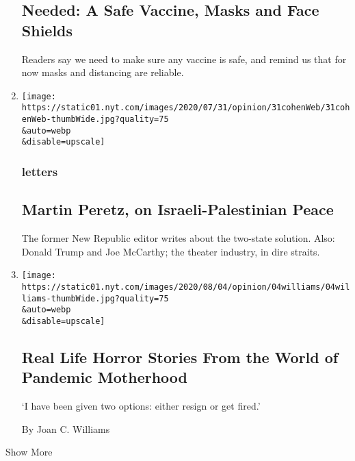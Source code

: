 \begin{enumerate}
{  \subsection{Needed: A Safe Vaccine, Masks and Face
  Shields}\label{needed-a-safe-vaccine-masks-and-face-shields}}

  Readers say we need to make sure any vaccine is safe, and remind us
  that for now masks and distancing are reliable.
\item
  \href{/2020/08/06/opinion/letters/israel-palestinians.html}{}

  \texttt{[image: https://static01.nyt.com/images/2020/07/31/opinion/31cohenWeb/31cohenWeb-thumbWide.jpg?quality=75\\\&auto=webp\\\&disable=upscale]}

  \hypertarget{letters-3}{%
  \subsubsection{letters}\label{letters-3}}

  \hypertarget{martin-peretz-on-israeli-palestinian-peace}{%
  \subsection{Martin Peretz, on Israeli-Palestinian
  Peace}\label{martin-peretz-on-israeli-palestinian-peace}}

  The former New Republic editor writes about the two-state solution.
  Also: Donald Trump and Joe McCarthy; the theater industry, in dire
  straits.
\item
  \href{/2020/08/06/opinion/mothers-discrimination-coronavirus.html}{}

  \texttt{[image: https://static01.nyt.com/images/2020/08/04/opinion/04williams/04williams-thumbWide.jpg?quality=75\\\&auto=webp\\\&disable=upscale]}

  \hypertarget{real-life-horror-stories-from-the-world-of-pandemic-motherhood}{%
  \subsection{Real Life Horror Stories From the World of Pandemic
  Motherhood}\label{real-life-horror-stories-from-the-world-of-pandemic-motherhood}}

  `I have been given two options: either resign or get fired.'

  By Joan C. Williams
\end{enumerate}

Show More


